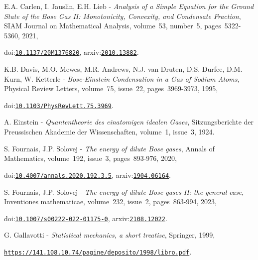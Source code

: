 E.A. Carlen, I. Jauslin, E.H. Lieb - {\it Analysis of a Simple Equation for the Ground State of the Bose Gas II: Monotonicity, Convexity, and Condensate Fraction}, SIAM Journal on Mathematical Analysis, volume\-~53, number\-~5, pages\-~5322-5360, 2021,\par{}
doi:{\tt\color{blue}\href{http://dx.doi.org/10.1137/20M1376820}{10.1137/20M1376820}}, arxiv:{\tt\color{blue}\href{http://arxiv.org/abs/2010.13882}{2010.13882}}.\par\medskip
 
K.B. Davis, M.O. Mewes, M.R. Andrews, N.J. van Druten, D.S. Durfee, D.M. Kurn, W. Ketterle - {\it Bose-Einstein Condensation in a Gas of Sodium Atoms}, Physical Review Letters, volume\-~75, issue\-~22, pages\-~3969-3973, 1995,\par{}
doi:{\tt\color{blue}\href{http://dx.doi.org/10.1103/PhysRevLett.75.3969}{10.1103/PhysRevLett.75.3969}}.\par\medskip
 
A. Einstein - {\it Quantentheorie des einatomigen idealen Gases}, Sitzungsberichte der Preussischen Akademie der Wissenschaften, volume\-~1, issue\-~3, 1924.\par\medskip
 
S. Fournais, J.P. Solovej - {\it  The energy of dilute Bose gases}, Annals of Mathematics, volume\-~192, issue\-~3, pages\-~893-976, 2020,\par{}
doi:{\tt\color{blue}\href{http://dx.doi.org/10.4007/annals.2020.192.3.5}{10.4007/annals.2020.192.3.5}}, arxiv:{\tt\color{blue}\href{http://arxiv.org/abs/1904.06164}{1904.06164}}.\par\medskip
 
S. Fournais, J.P. Solovej - {\it The energy of dilute Bose gases II: the general case}, Inventiones mathematicae, volume\-~232, issue\-~2, pages\-~863-994, 2023,\par{}
doi:{\tt\color{blue}\href{http://dx.doi.org/10.1007/s00222-022-01175-0}{10.1007/s00222-022-01175-0}}, arxiv:{\tt\color{blue}\href{http://arxiv.org/abs/2108.12022}{2108.12022}}.\par\medskip
 
G. Gallavotti - {\it Statistical mechanics, a short treatise}, Springer, 1999,\par{}
{\tt\color{blue}\href{https://141.108.10.74/pagine/deposito/1998/libro.pdf}{https://141.108.10.74/pagine/deposito/1998/libro.pdf}}.\par\medskip
 
